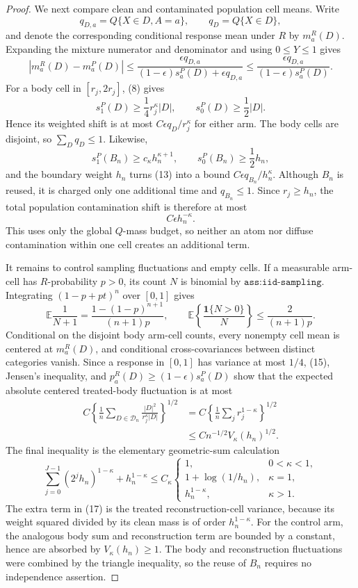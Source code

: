 \documentclass{article}
\begin{document}
\begin{proof}
We next compare clean and contaminated population cell means. Write
\[
q_{D,a}=Q\{X\in D,A=a\},
\qquad q_D=Q\{X\in D\},
\]
and denote the corresponding conditional response mean under \(R\) by \(m_a^R(D)\). Expanding the mixture numerator and denominator and using \(0\leq Y\leq1\) gives
\[
|m_a^R(D)-m_a^P(D)|
\leq\frac{\epsilon q_{D,a}}
{(1-\epsilon)s_a^P(D)+\epsilon q_{D,a}}
\leq\frac{\epsilon q_{D,a}}{(1-\epsilon)s_a^P(D)}.
\tag{13}
\]
For a body cell in \([r_j,2r_j]\), (8) gives
\[
s_1^P(D)\geq\frac14r_j^\kappa|D|,
\qquad
s_0^P(D)\geq\frac12|D|.
\]
Hence its weighted shift is at most \(C\epsilon q_D/r_j^\kappa\) for either arm. The body cells are disjoint, so \(\sum_Dq_D\leq1\). Likewise,
\[
s_1^P(B_n)\geq c_\kappa h_n^{\kappa+1},
\qquad
s_0^P(B_n)\geq\frac12h_n,
\]
and the boundary weight \(h_n\) turns (13) into a bound \(C\epsilon q_{B_n}/h_n^\kappa\). Although \(B_n\) is reused, it is charged only one additional time and \(q_{B_n}\leq1\). Since \(r_j\geq h_n\), the total population contamination shift is therefore at most
\[
C\epsilon h_n^{-\kappa}.
\tag{14}
\]
This uses only the global \(Q\)-mass budget, so neither an atom nor diffuse contamination within one cell creates an additional term.

It remains to control sampling fluctuations and empty cells. If a measurable arm-cell has \(R\)-probability \(p>0\), its count \(N\) is binomial by \(\texttt{ass:iid-sampling}\). Integrating \((1-p+pt)^n\) over \([0,1]\) gives
\[
\mathbb E\frac1{N+1}=\frac{1-(1-p)^{n+1}}{(n+1)p},
\qquad
\mathbb E\left\{\frac{\mathbf1\{N>0\}}N\right\}
\leq\frac2{(n+1)p}.
\tag{15}
\]
Conditional on the disjoint body arm-cell counts, every nonempty cell mean is centered at \(m_a^R(D)\), and conditional cross-covariances between distinct categories vanish. Since a response in \([0,1]\) has variance at most \(1/4\), (15), Jensen's inequality, and \(p_a^R(D)\geq(1-\epsilon)s_a^P(D)\) show that the expected absolute centered treated-body fluctuation is at most
\[
\begin{aligned}
C\left\{\frac1n\sum_{D\in\mathcal D_n}
\frac{|D|^2}{r_j^\kappa|D|}\right\}^{1/2}
&=C\left\{\frac1n\sum_jr_j^{1-\kappa}\right\}^{1/2}\\
&\leq Cn^{-1/2}V_\kappa(h_n)^{1/2}.
\end{aligned}
\tag{16}
\]
The final inequality is the elementary geometric-sum calculation
\[
\sum_{j=0}^{J-1}(2^jh_n)^{1-\kappa}+h_n^{1-\kappa}
\leq C_\kappa
\begin{cases}
1,&0<\kappa<1,\\
1+\log(1/h_n),&\kappa=1,\\
h_n^{1-\kappa},&\kappa>1.
\end{cases}
\tag{17}
\]
The extra term in (17) is the treated reconstruction-cell variance, because its weight squared divided by its clean mass is of order \(h_n^{1-\kappa}\). For the control arm, the analogous body sum and reconstruction term are bounded by a constant, hence are absorbed by \(V_\kappa(h_n)\geq1\). The body and reconstruction fluctuations were combined by the triangle inequality, so the reuse of \(B_n\) requires no independence assertion.


\end{proof}
\end{document}
